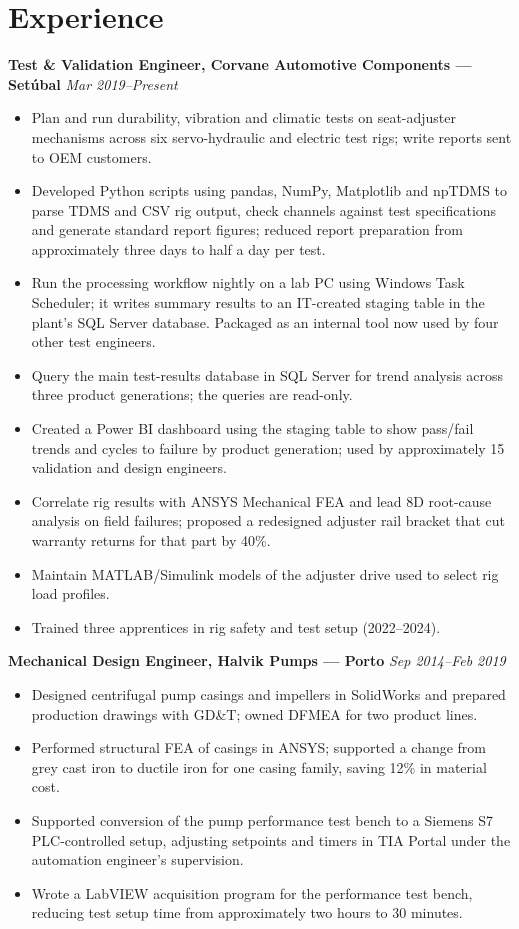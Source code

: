 \documentclass[11pt,a4paper]{article}
\begin{document}
\section*{Experience}
\textbf{Test \& Validation Engineer, Corvane Automotive Components — Setúbal} \hfill \textit{Mar 2019–Present}
\begin{itemize}
\item Plan and run durability, vibration and climatic tests on seat-adjuster mechanisms across six servo-hydraulic and electric test rigs; write reports sent to OEM customers.
\item Developed Python scripts using pandas, NumPy, Matplotlib and npTDMS to parse TDMS and CSV rig output, check channels against test specifications and generate standard report figures; reduced report preparation from approximately three days to half a day per test.
\item Run the processing workflow nightly on a lab PC using Windows Task Scheduler; it writes summary results to an IT-created staging table in the plant's SQL Server database. Packaged as an internal tool now used by four other test engineers.
\item Query the main test-results database in SQL Server for trend analysis across three product generations; the queries are read-only.
\item Created a Power BI dashboard using the staging table to show pass/fail trends and cycles to failure by product generation; used by approximately 15 validation and design engineers.
\item Correlate rig results with ANSYS Mechanical FEA and lead 8D root-cause analysis on field failures; proposed a redesigned adjuster rail bracket that cut warranty returns for that part by 40\%.
\item Maintain MATLAB/Simulink models of the adjuster drive used to select rig load profiles.
\item Trained three apprentices in rig safety and test setup (2022–2024).
\end{itemize}

\textbf{Mechanical Design Engineer, Halvik Pumps — Porto} \hfill \textit{Sep 2014–Feb 2019}
\begin{itemize}
\item Designed centrifugal pump casings and impellers in SolidWorks and prepared production drawings with GD\&T; owned DFMEA for two product lines.
\item Performed structural FEA of casings in ANSYS; supported a change from grey cast iron to ductile iron for one casing family, saving 12\% in material cost.
\item Supported conversion of the pump performance test bench to a Siemens S7 PLC-controlled setup, adjusting setpoints and timers in TIA Portal under the automation engineer's supervision.
\item Wrote a LabVIEW acquisition program for the performance test bench, reducing test setup time from approximately two hours to 30 minutes.
\end{itemize}
\end{document}
